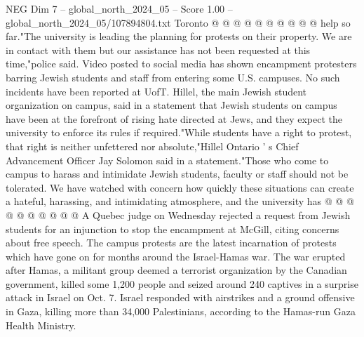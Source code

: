 \begin{textsample}{NEG Dim 7 – global\_north\_2024\_05 – Score 1.00 – global\_north\_2024\_05/107894804.txt}
Toronto @ @ @ @ @ @ @ @ @ @ help so far."The university is leading the planning for protests on their property.
We are in contact with them but our assistance has not been requested at this time,"police said.
Video posted to social media has shown encampment protesters barring Jewish students and staff from entering some U.S. campuses.
No such incidents have been reported at UofT.
Hillel, the main Jewish student organization on campus, said in a statement that Jewish students on campus have been at the forefront of rising hate directed at Jews, and they expect the university to enforce its rules if required."While students have a right to protest, that right is neither unfettered nor absolute,"Hillel Ontario ' s Chief Advancement Officer Jay Solomon said in a statement."Those who come to campus to harass and intimidate Jewish students, faculty or staff should not be tolerated.
We have watched with concern how quickly these situations can create a hateful, harassing, and intimidating atmosphere, and the university has @ @ @ @ @ @ @ @ @ @ A Quebec judge on Wednesday rejected a request from Jewish students for an injunction to stop the encampment at McGill, citing concerns about free speech.
The campus protests are the latest incarnation of protests which have gone on for months around the Israel-Hamas war.
The war erupted after Hamas, a militant group deemed a terrorist organization by the Canadian government, killed some 1,200 people and seized around 240 captives in a surprise attack in Israel on Oct. 7.
Israel responded with airstrikes and a ground offensive in Gaza, killing more than 34,000 Palestinians, according to the Hamas-run Gaza Health Ministry.

\end{textsample}
